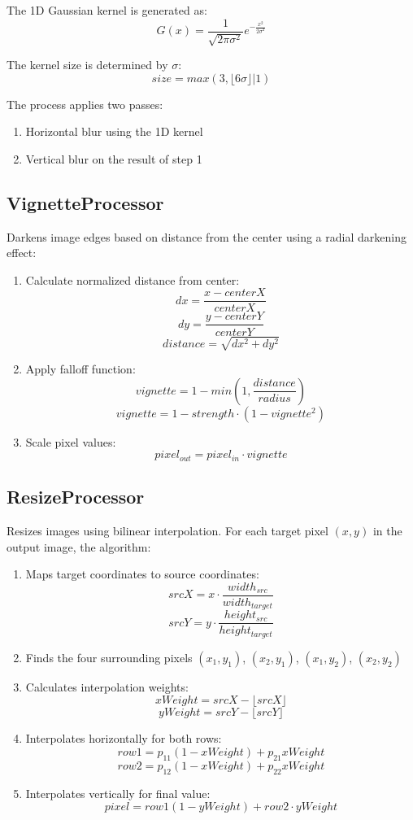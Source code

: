 \documentclass[12pt,a4paper]{report}
\begin{document}
The 1D Gaussian kernel is generated as:
\[ G(x) = \frac{1}{\sqrt{2\pi\sigma^2}} e^{-\frac{x^2}{2\sigma^2}} \]

The kernel size is determined by $\sigma$:
\[ size = max(3, \lfloor 6\sigma \rfloor | 1) \]

The process applies two passes:
\begin{enumerate}
    \item Horizontal blur using the 1D kernel
    \item Vertical blur on the result of step 1
\end{enumerate}

\subsection{VignetteProcessor}
Darkens image edges based on distance from the center using a radial darkening effect:
\begin{enumerate}
    \item Calculate normalized distance from center:
    \[ dx = \frac{x - centerX}{centerX} \]
    \[ dy = \frac{y - centerY}{centerY} \]
    \[ distance = \sqrt{dx^2 + dy^2} \]
    
    \item Apply falloff function:
    \[ vignette = 1 - min(1, \frac{distance}{radius}) \]
    \[ vignette = 1 - strength \cdot (1 - vignette^2) \]
    
    \item Scale pixel values:
    \[ pixel_{out} = pixel_{in} \cdot vignette \]
\end{enumerate}

\subsection{ResizeProcessor}
Resizes images using bilinear interpolation. For each target pixel $(x, y)$ in the output image, the algorithm:

\begin{enumerate}
    \item Maps target coordinates to source coordinates:
    \[ srcX = x \cdot \frac{width_{src}}{width_{target}} \]
    \[ srcY = y \cdot \frac{height_{src}}{height_{target}} \]
    
    \item Finds the four surrounding pixels $(x_1, y_1)$, $(x_2, y_1)$, $(x_1, y_2)$, $(x_2, y_2)$
    \item Calculates interpolation weights:
    \[ xWeight = srcX - \lfloor srcX \rfloor \]
    \[ yWeight = srcY - \lfloor srcY \rfloor \]
    
    \item Interpolates horizontally for both rows:
    \[ row1 = p_{11}(1-xWeight) + p_{21}xWeight \]
    \[ row2 = p_{12}(1-xWeight) + p_{22}xWeight \]
    
    \item Interpolates vertically for final value:
    \[ pixel = row1(1-yWeight) + row2 \cdot yWeight \]
\end{enumerate}
\end{document}
